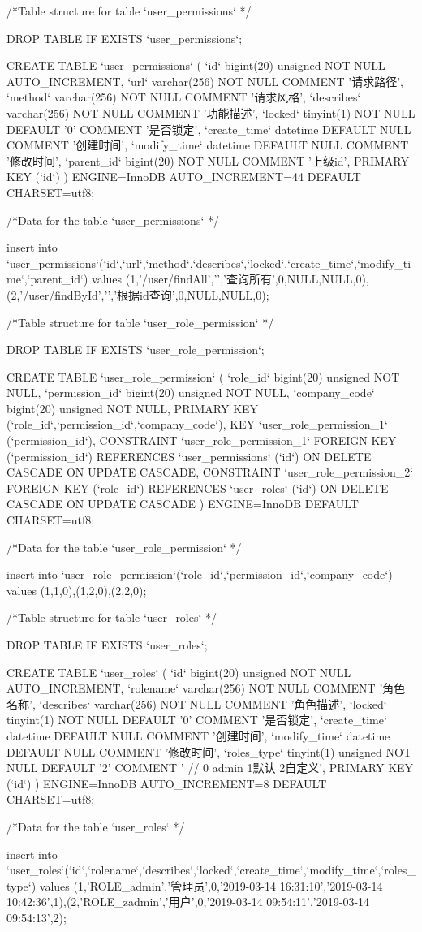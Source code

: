 /*Table structure for table `user_permissions` */

DROP TABLE IF EXISTS `user_permissions`;

CREATE TABLE `user_permissions` (
  `id` bigint(20) unsigned NOT NULL AUTO_INCREMENT,
  `url` varchar(256) NOT NULL COMMENT '请求路径',
  `method` varchar(256) NOT NULL COMMENT '请求风格',
  `describes` varchar(256) NOT NULL COMMENT '功能描述',
  `locked` tinyint(1) NOT NULL DEFAULT '0' COMMENT '是否锁定',
  `create_time` datetime DEFAULT NULL COMMENT '创建时间',
  `modify_time` datetime DEFAULT NULL COMMENT '修改时间',
  `parent_id` bigint(20) NOT NULL COMMENT '上级id',
  PRIMARY KEY (`id`)
) ENGINE=InnoDB AUTO_INCREMENT=44 DEFAULT CHARSET=utf8;

/*Data for the table `user_permissions` */

insert  into `user_permissions`(`id`,`url`,`method`,`describes`,`locked`,`create_time`,`modify_time`,`parent_id`) values (1,'/user/findAll','','查询所有',0,NULL,NULL,0),(2,'/user/findById','','根据id查询',0,NULL,NULL,0);

/*Table structure for table `user_role_permission` */

DROP TABLE IF EXISTS `user_role_permission`;

CREATE TABLE `user_role_permission` (
  `role_id` bigint(20) unsigned NOT NULL,
  `permission_id` bigint(20) unsigned NOT NULL,
  `company_code` bigint(20) unsigned NOT NULL,
  PRIMARY KEY (`role_id`,`permission_id`,`company_code`),
  KEY `user_role_permission_1` (`permission_id`),
  CONSTRAINT `user_role_permission_1` FOREIGN KEY (`permission_id`) REFERENCES `user_permissions` (`id`) ON DELETE CASCADE ON UPDATE CASCADE,
  CONSTRAINT `user_role_permission_2` FOREIGN KEY (`role_id`) REFERENCES `user_roles` (`id`) ON DELETE CASCADE ON UPDATE CASCADE
) ENGINE=InnoDB DEFAULT CHARSET=utf8;

/*Data for the table `user_role_permission` */

insert  into `user_role_permission`(`role_id`,`permission_id`,`company_code`) values (1,1,0),(1,2,0),(2,2,0);

/*Table structure for table `user_roles` */

DROP TABLE IF EXISTS `user_roles`;

CREATE TABLE `user_roles` (
  `id` bigint(20) unsigned NOT NULL AUTO_INCREMENT,
  `rolename` varchar(256) NOT NULL COMMENT '角色名称',
  `describes` varchar(256) NOT NULL COMMENT '角色描述',
  `locked` tinyint(1) NOT NULL DEFAULT '0' COMMENT '是否锁定',
  `create_time` datetime DEFAULT NULL COMMENT '创建时间',
  `modify_time` datetime DEFAULT NULL COMMENT '修改时间',
  `roles_type` tinyint(1) unsigned NOT NULL DEFAULT '2' COMMENT ' // 0 admin 1默认 2自定义',
  PRIMARY KEY (`id`)
) ENGINE=InnoDB AUTO_INCREMENT=8 DEFAULT CHARSET=utf8;

/*Data for the table `user_roles` */

insert  into `user_roles`(`id`,`rolename`,`describes`,`locked`,`create_time`,`modify_time`,`roles_type`) values (1,'ROLE_admin','管理员',0,'2019-03-14 16:31:10','2019-03-14 10:42:36',1),(2,'ROLE_zadmin','用户',0,'2019-03-14 09:54:11','2019-03-14 09:54:13',2);

